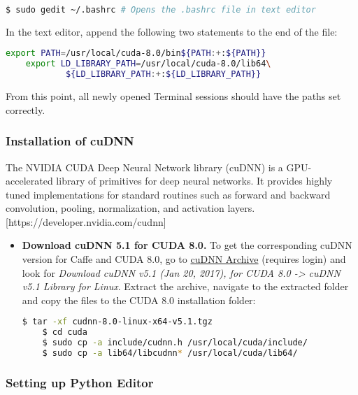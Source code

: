 \begin{itemize}
	\begin{lstlisting}[language=bash]
	$ sudo gedit ~/.bashrc # Opens the .bashrc file in text editor
	\end{lstlisting}
	
	In the text editor, append the following two statements to the end of the file:
	
	\begin{lstlisting}[language=bash]
	export PATH=/usr/local/cuda-8.0/bin${PATH:+:${PATH}}
	export LD_LIBRARY_PATH=/usr/local/cuda-8.0/lib64\
			${LD_LIBRARY_PATH:+:${LD_LIBRARY_PATH}}
	\end{lstlisting}	
	
	From this point, all newly opened Terminal sessions should have the paths set correctly.
	
\end{itemize}

\subsubsection{Installation of cuDNN}

The NVIDIA CUDA Deep Neural Network library (cuDNN) is a GPU-accelerated library of primitives for deep neural networks. It provides highly tuned implementations for standard routines such as forward and backward convolution, pooling, normalization, and activation layers. [https://developer.nvidia.com/cudnn] 

\begin{itemize}
	\item \textbf{Download cuDNN 5.1 for CUDA 8.0.} To get the corresponding cuDNN version for Caffe and CUDA 8.0, go to \href{https://developer.nvidia.com/rdp/cudnn-archive}{cuDNN Archive} (requires login) and look for \textit{Download cuDNN v5.1 (Jan 20, 2017), for CUDA 8.0 -> cuDNN v5.1 Library for Linux}. Extract the archive, navigate to the extracted folder and copy the files to the CUDA 8.0 installation folder:
	
	\begin{lstlisting}[language=bash]
	$ tar -xf cudnn-8.0-linux-x64-v5.1.tgz 
	$ cd cuda
	$ sudo cp -a include/cudnn.h /usr/local/cuda/include/
	$ sudo cp -a lib64/libcudnn* /usr/local/cuda/lib64/
	\end{lstlisting}	
\end{itemize}

\subsubsection{Setting up Python Editor}

